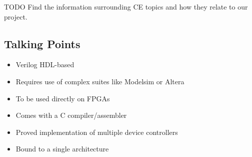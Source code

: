 \cite{cec2016}

TODO Find the information surrounding CE topics and how they relate to our project. 

\subsection{Talking Points}

\begin{itemize}
\item Verilog HDL-based
\item Requires use of complex suites like Modelsim or Altera
\item To be used directly on FPGAs
\item Comes with a C compiler/assembler
\item Proved implementation of multiple device controllers
\item Bound to a single architecture
\end{itemize}


